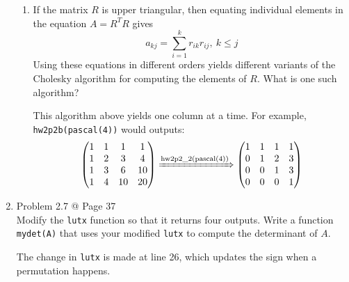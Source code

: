 \documentclass[10pt]{report}
\begin{document}
\begin{enumerate}
\begin{enumerate}
		\item 
		If the matrix $R$ is upper triangular, then equating individual elements in
		the equation $A = R^T R$ gives
		\[
		a_{kj} = \sum_{i=1}^{k} r_{ik}r_{ij},\ k\le j
		\]
		Using these equations in different orders yields different variants of the Cholesky
		algorithm for computing the elements of $R$. What is one such algorithm?
		
		This algorithm above yields one column at a time. For example, \verb|hw2p2b(pascal(4))| would outputs:
		\[
		\begin{pmatrix}
		1 & 1 & 1 & 1\\
		1 & 2 & 3 & 4\\
		1 & 3 & 6 & 10\\
		1 & 4 & 10 & 20
		\end{pmatrix}
		\xRightarrow{\text{hw2p2\_2(pascal(4))}}
		\begin{pmatrix}
		1 & 1 & 1 & 1\\
		0 & 1 & 2 & 3\\
		0 & 0 & 1 & 3\\
		0 & 0 & 0 & 1
		\end{pmatrix}
		\]
	\end{enumerate}

	\item 
	Problem 2.7 @ Page 37\\
	Modify the \verb|lutx| function so that it returns four outputs. Write a function \verb|mydet(A)| that uses your modified \verb|lutx| to compute the
	determinant of $A$. 
	
	The change in \verb|lutx| is made at line 26, which updates the sign when a permutation happens.


\end{enumerate}
\end{document}
